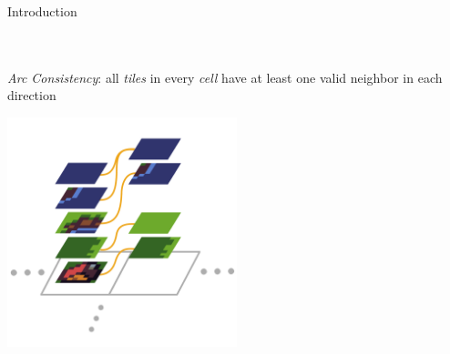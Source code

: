 \documentclass{beamer}
\begin{document}
  \begin{frame}[fragile]{Introduction}

    \hfill \\
    \hfill \\

    \textit{Arc Consistency}: all \textit{tiles} in every \textit{cell} have at least
    one valid neighbor in each direction
    \begin{center}
      \includegraphics[width=0.5\textwidth]{figs/ac_illustration_consistent.pdf}
    \end{center}

  \end{frame}
\end{document}
